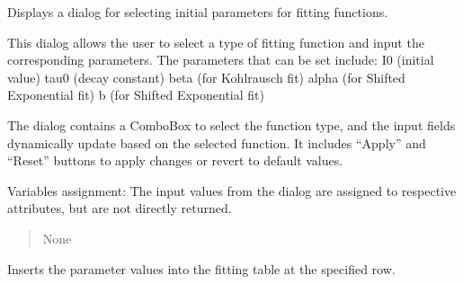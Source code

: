 \documentclass[letterpaper,10pt,english]{sphinxmanual}
\begin{document}
\begin{fulllineitems}

\begin{fulllineitems}
\label{\detokenize{FLIMGraphics:FLIMGraphics.FLIMGraphic.initialParametersDialog}}
\pysigstartsignatures
{}
\pysigstopsignatures
\sphinxAtStartPar
Displays a dialog for selecting initial parameters for fitting functions.

\sphinxAtStartPar
This dialog allows the user to select a type of fitting function and input the corresponding parameters.
The parameters that can be set include:
\sphinxhyphen{} I0 (initial value)
\sphinxhyphen{} tau0 (decay constant)
\sphinxhyphen{} beta (for Kohlrausch fit)
\sphinxhyphen{} alpha (for Shifted Exponential fit)
\sphinxhyphen{} b (for Shifted Exponential fit)

\sphinxAtStartPar
The dialog contains a ComboBox to select the function type, and the input fields dynamically update based on
the selected function. It includes “Apply” and “Reset” buttons to apply changes or revert to default values.

\sphinxAtStartPar
Variables assignment:
\sphinxhyphen{} The input values from the dialog are assigned to respective attributes, but are not directly returned.
\begin{quote}\begin{description}
\sphinxAtStartPar
None

\end{description}\end{quote}

\end{fulllineitems}


\begin{fulllineitems}
\label{\detokenize{FLIMGraphics:FLIMGraphics.FLIMGraphic.insertParameters}}
\pysigstartsignatures
{}
\pysigstopsignatures
\sphinxAtStartPar
Inserts the parameter values into the fitting table at the specified row.


\end{fulllineitems}
\end{fulllineitems}
\end{document}
